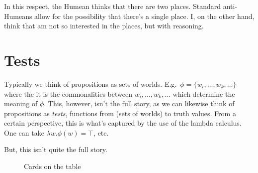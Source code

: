 \documentclass[10pt]{article}
\begin{document}
In this respect, the Humean thinks that there are two places.
Standard anti-Humeans allow for the possibility that there's a single place.
I, on the other hand, think that am not so interested in the places, but with reasoning.


\section{Tests}
\label{sec:tests}

Typically we think of propositions as sets of worlds.
E.g.\ \(\phi = \{w_{i}, \dots, w_{k}, \dots\}\) where the it is the commonalities between \(w_{i}, \dots, w_{k}, \dots\) which determine the meaning of \(\phi\).
This, however, isn't the full story, as we can likewise think of propositions as \emph{tests}, functions from (sets of worlds) to truth values.
From a certain perspective, this is what's captured by the use of the lambda calculus.
One can take \(\lambda w.\phi(w) = \top\), etc.\

But, this isn't quite the full story.


\begin{figure}[h]
  \centering
  \caption{Cards on the table}
  \label{fig:cards}
\end{figure}



\newpage
\printbibliography
\end{document}
